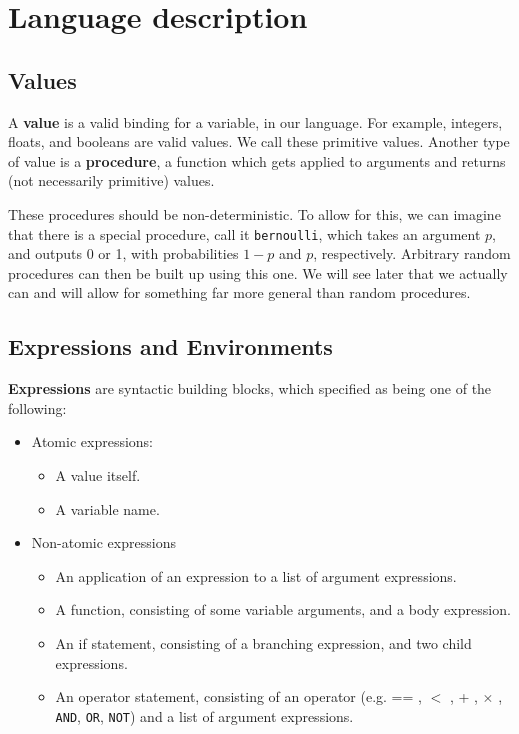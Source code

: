 \documentclass[11pt]{article}
\begin{document}



\section{Language description}

\subsection{Values}

A {\bf value} is a valid binding for a variable, in our language.  For example, integers, floats, and booleans are valid values.  We call these primitive values.  Another type of value is a {\bf procedure}, a function which gets applied to arguments and returns (not necessarily primitive) values.  

These procedures should be non-deterministic.  To allow for this, we can imagine that there is a special procedure, call it {\tt bernoulli}, which takes an argument $p$, and outputs 0 or 1, with probabilities $1-p$ and $p$, respectively.  Arbitrary random procedures can then be built up using this one.   We will see later that we actually can and will allow for something far more general than random procedures.



\subsection{Expressions and Environments}

{\bf Expressions} are syntactic building blocks, which specified as being one of the following:
\begin{itemize}
\item Atomic expressions:
\begin{itemize}
\item A value itself.
\item A variable name.
\end{itemize}
\item Non-atomic expressions
\begin{itemize}
\item An application of an expression to a list of argument expressions.
\item A function, consisting of some variable arguments, and a body expression.
\item An if statement, consisting of a branching expression, and two child expressions.
\item An operator statement, consisting of an operator (e.g. == , $<$ , + , $\times$ , {\tt AND}, {\tt OR}, {\tt NOT}) and a list of argument expressions.
\end{itemize}
\end{itemize}
\end{document}
